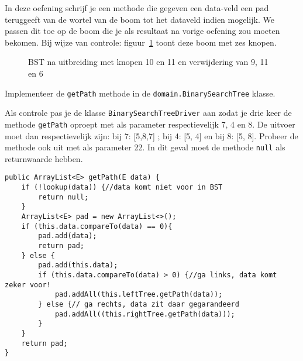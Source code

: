 \begin{oef}
\code In deze oefening schrijf je een methode die gegeven een data-veld een pad teruggeeft van de wortel van de boom tot het dataveld indien mogelijk. We passen dit toe op de boom die je als resultaat na vorige oefening zou moeten bekomen. Bij wijze van controle: figuur~\ref{fig:oefgetpathboom} toont deze boom met zes knopen.
\begin{figure}[htbp]
    \centering
{}
\cprotect\caption{BST na uitbreiding met knopen 10 en 11 en verwijdering van 9, 11 en 6}
    \label{fig:oefgetpathboom}
\end{figure}
\begin{oefenumerate}
	\item Implementeer de \verb=getPath= methode in de \verb=domain.BinarySearchTree= klasse.
	\item Als controle pas je de klasse  \verb=BinarySearchTreeDriver= aan zodat je drie keer de methode \verb+getPath+ oproept met als parameter respectievelijk 7, 4 en 8. De uitvoer moet dan respectievelijk zijn: bij 7: [5,8,7] ; bij 4: [5, 4] en bij 8: [5, 8]. Probeer de methode ook uit met als parameter 22. In dit geval moet de methode \verb+null+ als returnwaarde hebben.
	
\end{oefenumerate}
\begin{opl}
\begin{lstlisting}[caption={getPath methode}, label=bstgetpath]
public ArrayList<E> getPath(E data) {
	if (!lookup(data)) {//data komt niet voor in BST
		return null;
	}
	ArrayList<E> pad = new ArrayList<>();
	if (this.data.compareTo(data) == 0){
		pad.add(data);
		return pad;
	} else {
		pad.add(this.data);
		if (this.data.compareTo(data) > 0) {//ga links, data komt zeker voor!
			pad.addAll(this.leftTree.getPath(data));
		} else {// ga rechts, data zit daar gegarandeerd
			pad.addAll((this.rightTree.getPath(data)));
		}
	}
	return pad;
}
\end{lstlisting}

\end{opl}
\end{oef}

